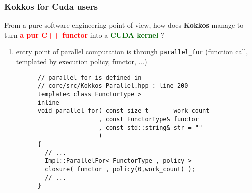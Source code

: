 \begin{frame}[fragile=singleslide]
  \frametitle{Kokkos for Cuda users}

  From a pure software engineering point of view, how does {\bf Kokkos} manage to turn \textcolor{red}{\bf a pur C++ functor} into a \textcolor{darkgreen}{\bf CUDA kernel} ?

  \begin{enumerate}
  \item entry point of parallel computation is through \texttt{parallel\_for} (function call, templated by execution policy, functor, ...)
    \begin{verbatim}
      // parallel_for is defined in
      // core/src/Kokkos_Parallel.hpp : line 200
      template< class FunctorType >
      inline
      void parallel_for( const size_t       work_count
                       , const FunctorType& functor
                       , const std::string& str = ""
                       )
      {
        // ...
        Impl::ParallelFor< FunctorType , policy >
        closure( functor , policy(0,work_count) );
        // ...
      }
    \end{verbatim}
  \end{enumerate}

\end{frame}

